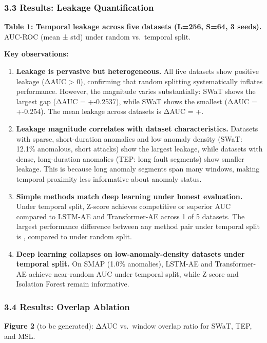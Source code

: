 \documentclass[
]{article}
\begin{document}
\subsubsection{3.3 Results: Leakage
Quantification}\label{results-leakage-quantification}

\textbf{Table 1: Temporal leakage across five datasets (L=256, S=64, 3
seeds).} AUC-ROC (mean ± std) under random vs.~temporal split.

\textbf{Key observations:}

\begin{enumerate}
\def\labelenumi{\arabic{enumi}.}
\item
  \textbf{Leakage is pervasive but heterogeneous.} All five datasets
  show positive leakage (ΔAUC \textgreater{} 0), confirming that random
  splitting systematically inflates performance. However, the magnitude
  varies substantially: SWaT shows the largest gap (ΔAUC = +-0.2537),
  while SWaT shows the smallest (ΔAUC = +-0.254). The mean leakage
  across datasets is ΔAUC = +.
\item
  \textbf{Leakage magnitude correlates with dataset characteristics.}
  Datasets with sparse, short-duration anomalies and low anomaly density
  (SWaT: 12.1\% anomalous, short attacks) show the largest leakage,
  while datasets with dense, long-duration anomalies (TEP: long fault
  segments) show smaller leakage. This is because long anomaly segments
  span many windows, making temporal proximity less informative about
  anomaly status.
\item
  \textbf{Simple methods match deep learning under honest evaluation.}
  Under temporal split, Z-score achieves competitive or superior AUC
  compared to LSTM-AE and Transformer-AE across 1 of 5 datasets. The
  largest performance difference between any method pair under temporal
  split is , compared to under random split.
\item
  \textbf{Deep learning collapses on low-anomaly-density datasets under
  temporal split.} On SMAP (1.0\% anomalies), LSTM-AE and Transformer-AE
  achieve near-random AUC under temporal split, while Z-score and
  Isolation Forest remain informative.
\end{enumerate}

\subsubsection{3.4 Results: Overlap
Ablation}\label{results-overlap-ablation}

\textbf{Figure 2} (to be generated): ΔAUC vs.~window overlap ratio for
SWaT, TEP, and MSL.
\end{document}
